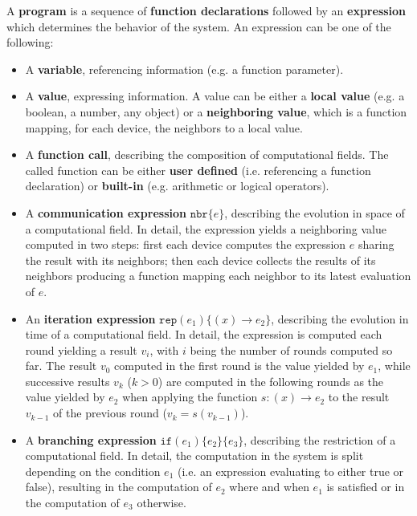 A \textbf{program} is a sequence of \textbf{function declarations} followed by
an \textbf{expression} which determines the behavior of the system. An
expression can be one of the following:
\begin{itemize}
  \item A \textbf{variable}, referencing information (e.g. a function
        parameter).
  \item A \textbf{value}, expressing information. A value can be either a
        \textbf{local value} (e.g. a boolean, a number, any object) or a
        \textbf{neighboring value}, which is a function mapping, for each
        device, the neighbors to a local value.
  \item A \textbf{function call}, describing the composition of computational
        fields. The called function can be either \textbf{user defined} (i.e.
        referencing a function declaration) or \textbf{built-in} (e.g.
        arithmetic or logical operators).
  \item A \textbf{communication expression} $\texttt{nbr}\{e\}$, describing the
        evolution in space of a computational field. In detail, the expression
        yields a neighboring value computed in two steps: first each device
        computes the expression $e$ sharing the result with its neighbors; then
        each device collects the results of its neighbors producing a function
        mapping each neighbor to its latest evaluation of $e$.

        

  \item An \textbf{iteration expression} $\texttt{rep}(e_1)\{(x) \rightarrow
        e_2 \}$, describing the evolution in time of a computational field. In
        detail, the expression is computed each round yielding a result $v_i$,
        with $i$ being the number of rounds computed so far. The result $v_0$
        computed in the first round is the value yielded by $e_1$, while
        successive results $v_k$ ($k > 0$) are computed in the following rounds
        as the value yielded by $e_2$ when applying the function $s: (x)
        \rightarrow e_2$ to the result $v_{k-1}$ of the previous round ($v_k =
        s(v_{k-1})$).
  \item A \textbf{branching expression} $\texttt{if}(e_1)\{e_2\}\{e_3\}$,
        describing the restriction of a computational field. In detail, the
        computation in the system is split depending on the condition $e_1$
        (i.e. an expression evaluating to either true or false), resulting in
        the computation of ${e_2}$ where and when $e_1$ is satisfied or in the
        computation of $e_3$ otherwise.


\end{itemize}

